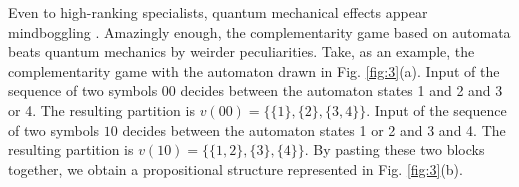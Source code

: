 
Even to high-ranking specialists, quantum mechanical effects appear
mindboggling \cite{green-horn-zei}.
Amazingly enough,
the complementarity game based on automata beats quantum mechanics by
weirder peculiarities.
Take, as an example, the complementarity game with the automaton drawn
in Fig.
\ref{fig:3}(a).
Input of the sequence of two symbols $00$ decides between the automaton
states 1 and 2 and 3 or 4. The resulting partition is
$v(00)=\{ \{1\},\{2\},\{3,4\}\}$.
Input of the sequence of two symbols $10$ decides between the automaton
states 1 or 2 and 3 and 4. The resulting partition is
$v(10)=\{ \{1,2\},\{3\},\{4\}\}$.
By pasting these two blocks
together, we obtain a propositional
structure represented in Fig.
\ref{fig:3}(b).
